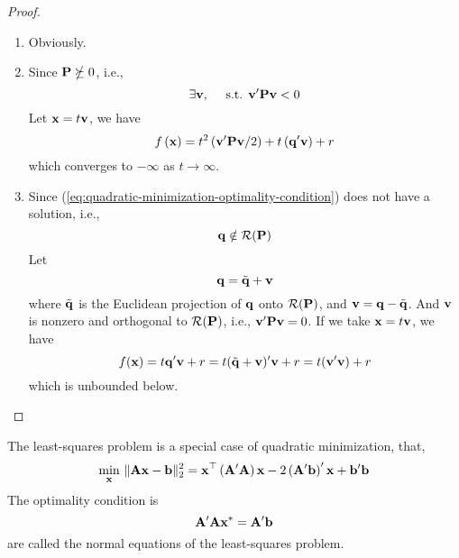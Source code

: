\begin{proof}
	\hfill
	\begin{enumerate}
		\item
		      Obviously.

		\item
		      Since ${\bf P}\nsucceq 0$, i.e.,
		      \begin{equation*}
			      \exists{\bf v},\quad\text{ s.t. }{\bf v}^{\prime}{\bf P}{\bf v}<0
		      \end{equation*}
		      Let ${\bf x}=t{\bf v}$, we have
		      \begin{equation*}
			      f\left({\bf x}\right)=t^{2}\left({\bf v}^{\prime}{\bf P}{\bf v}/2\right)+t\left({\bf q}^{\prime}{\bf v}\right)+r
		      \end{equation*}
		      which converges to $-\infty$ as $t\rightarrow\infty$.

		\item
		      Since (\ref{eq:quadratic-minimization-optimality-condition}) does not have a solution, i.e.,
		      \begin{equation*}
			      {\bf q}\notin\mathcal{R}({\bf P})
		      \end{equation*}
		      Let
		      \begin{equation*}
			      {\bf q}=\tilde{{\bf q}}+{\bf v}
		      \end{equation*}
		      where $\tilde{{\bf q}}$ is the Euclidean projection of ${\bf q}$ onto $\mathcal{R}({\bf P})$, and ${\bf v}={\bf q}-\tilde{{\bf q}}$. And ${\bf v}$ is nonzero and orthogonal to $\mathcal{R}({\bf P})$, i.e., ${\bf v}^{\prime}{\bf P}{\bf v}=0$. If we take ${\bf x}=t{\bf v}$, we have
		      \begin{equation*}
			      f({\bf x})=t{\bf q}^{\prime}{\bf v}+r=t(\tilde{{\bf q}}+{\bf v})^{\prime}{\bf v}+r=t({\bf v}^{\prime}{\bf v})+r
		      \end{equation*}
		      which is unbounded below.
	\end{enumerate}
\end{proof}

\begin{remark}
	The least-squares problem is a special case of quadratic minimization, that,
	\begin{equation*}
		\min_{{\bf x}}\,\|{\bf A}{\bf x}-{\bf b}\|_{2}^{2}={\bf x}^{\top}\left({\bf A}^{\prime}{\bf A}\right){\bf x}-2\left({\bf A}^{\prime}{\bf b}\right)^{\prime}{\bf x}+{\bf b}^{\prime}{\bf b}
	\end{equation*}
	The optimality condition is
	\begin{equation*}
		{\bf A}^{\prime}{\bf A}{\bf x}^{*}={\bf A}^{\prime}{\bf b}
	\end{equation*}
	are called the normal equations of the least-squares problem.
\end{remark}

